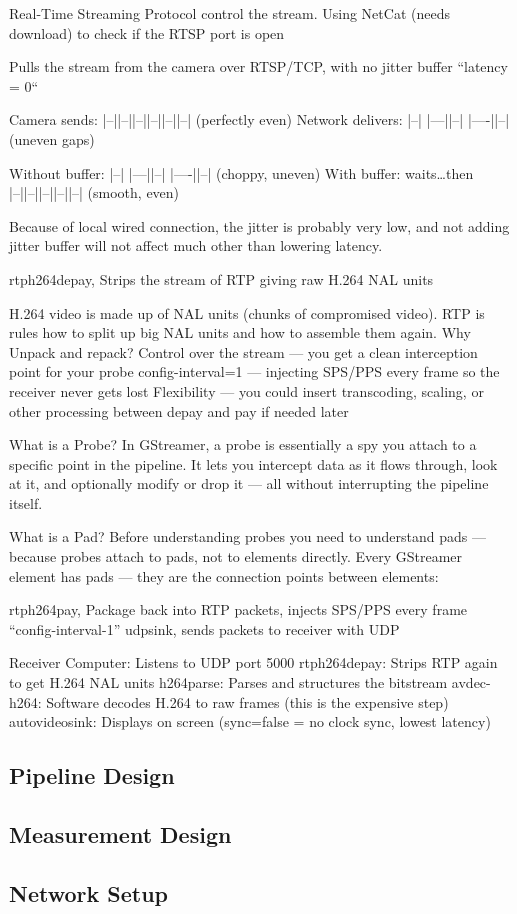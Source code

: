 Real-Time Streaming Protocol control the stream. Using NetCat (needs download) to check if the RTSP port is open

Pulls the stream from the camera over RTSP/TCP, with no jitter buffer ``latency = 0``

Camera sends:     |--||--||--||--||--||--|    (perfectly even)
Network delivers: |--| |---||--| |----||--|   (uneven gaps)

Without buffer:  |--| |---||--| |----||--|    (choppy, uneven)
With buffer:     waits\dots then |--||--||--||--||--|   (smooth, even)

Because of local wired connection, the jitter is probably very low, and not adding jitter buffer will not affect much other than lowering latency.

rtph264depay, Strips the stream of RTP giving raw H.264 NAL units

H.264 video is made up of NAL units (chunks of compromised video). RTP is rules how to split up big NAL units and how to assemble them again.
Why Unpack and repack?
Control over the stream — you get a clean interception point for your probe
config-interval=1 — injecting SPS/PPS every frame so the receiver never gets lost
Flexibility — you could insert transcoding, scaling, or other processing between depay and pay if needed later

What is a Probe?
In GStreamer, a probe is essentially a spy you attach to a specific point in the pipeline. It lets you intercept data as it flows through, look at it, and optionally modify or drop it — all without interrupting the pipeline itself.

What is a Pad?
Before understanding probes you need to understand pads — because probes attach to pads, not to elements directly.
Every GStreamer element has pads — they are the connection points between elements:


rtph264pay, Package back into RTP packets, injects SPS/PPS every frame ``config-interval-1''
udpsink, sends packets to receiver with UDP 


Receiver Computer:
Listens to UDP port 5000
rtph264depay: Strips RTP again to get H.264 NAL units
h264parse: Parses and structures the bitstream
avdec-h264: Software decodes H.264 to raw frames (this is the expensive step)
autovideosink: Displays on screen (sync=false = no clock sync, lowest latency)


\subsection{Pipeline Design}
\subsection{Measurement Design}
\subsection{Network Setup}